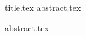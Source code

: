 {title.tex}
\ifccs
  {abstract.tex}
\fi
\maketitle

\iftoday
  \noindent
\fi

\ifoakland
  \IEEEpeerreviewmaketitle
\fi

\ifccs
\else
  {abstract.tex}
\fi